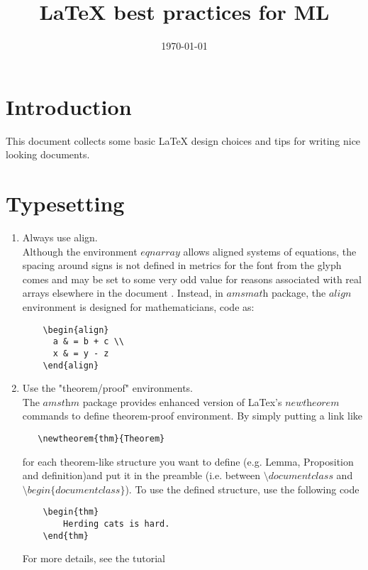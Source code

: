 \documentclass{article}
\title{LaTeX best practices for ML}
\author{}
\date{\today}
\begin{document}
\maketitle

\section{Introduction}
This document collects some basic LaTeX design choices and tips for writing nice looking documents. 

\section{Typesetting}

\begin{enumerate}
    \item Always use align. \\
    Although the environment $\textit{eqnarray}$ allows aligned systems of equations, the spacing around signs is not defined in metrics for the font from the glyph comes and may be set to some very odd value for reasons associated with real arrays elsewhere in the document \cite{Madsen:PJ:2006-4}. Instead, in $\textit{amsmath}$ package, the $\textit{align}$ environment is designed for mathematicians, code as:
    
    \begin{lstlisting}
    \begin{align}
      a & = b + c \\
      x & = y - z
    \end{align}
    \end{lstlisting}
   
   \item Use the "theorem/proof" environments.\\
   The $\textit{amsthm}$ package provides enhanced version of LaTex's $\textit{newtheorem}$ commands to define theorem-proof environment. By simply putting a link like
   \begin{lstlisting}
   \newtheorem{thm}{Theorem}
   \end{lstlisting}
   for each theorem-like structure you want to define (e.g. Lemma, Proposition and definition)and put it in the preamble (i.e. between $\textit{\textbackslash documentclass}$ and $\textit{\textbackslash begin\{documentclass\}}$). To use the defined structure, use the following code
   \begin{lstlisting}
    \begin{thm}
        Herding cats is hard.
    \end{thm}
   \end{lstlisting}
   For more details, see the tutorial \cite{MITtheorem}
   

\end{enumerate}
\end{document}
